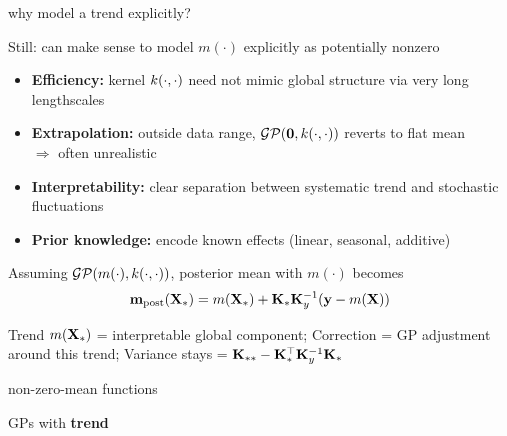\documentclass[11pt,compress,t,notes=noshow, xcolor=table]{beamer}
\begin{document}

\begin{framei}[sep=L]{why model a trend explicitly?}
\item Still: can make sense to model $m(\cdot)$ explicitly as potentially nonzero
\begin{itemize}
  \item \textbf{Efficiency:} kernel $k(\cdot, \cdot)$ need not mimic global structure via very long lengthscales
  \item \textbf{Extrapolation:} outside data range, $\mathcal{GP}(\mathbf{0}, k(\cdot, \cdot))$ reverts to flat mean \\ $\Rightarrow$ often unrealistic
  \item \textbf{Interpretability:} clear separation between systematic trend and stochastic fluctuations
  \item \textbf{Prior knowledge:} encode known effects (linear, seasonal, additive)
\end{itemize}
\item Assuming $\mathcal{GP}(m(\cdot), k(\cdot, \cdot))$, posterior mean with $m(\cdot)$ becomes
$$\mathbf{m}_{\text{post}}(\mathbf{X}_\ast) = m(\mathbf{X}_\ast) + \mathbf{K}_{\ast} \mathbf{K}_y^{-1}(\mathbf{y} - m(\mathbf{X}))$$
\item Trend $m(\mathbf{X}_\ast)$ = interpretable global component; Correction = GP adjustment around this trend; Variance stays = $\mathbf{K}_{\ast \ast} - \mathbf{K}_{\ast}^\top \mathbf{K}_y^{-1}\mathbf{K}_{\ast}$
\end{framei}




\begin{framei}[sep=M]{non-zero-mean functions}
\item GPs with \textbf{trend}
\vfill
{}
\vfill
{}
\end{framei}
\end{document}

